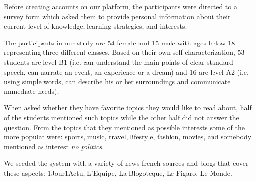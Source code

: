Before creating accounts on our platform, the participants were directed to a survey form which asked them to provide personal information about their current level of knowledge, learning strategies, and interests. 

The participants in our study are 54 female and 15 male with ages below 18 representing three different classes. Based on their own self characterization, 53 students are level B1 (i.e. can understand the main points of clear standard speech, can narrate an event, an experience or a dream) and 16 are level A2 (i.e. using simple words, can describe his or her surroundings and communicate immediate needs). 


When asked whether they have favorite topics they would like to read about, half of the students mentioned such topics while the other half did not answer the question. From the topics that they mentioned as possible interests some of the more popular were: sports, music, travel, lifestyle, fashion, movies, and somebody mentioned as interest {\em no politics}.

We seeded the system with a variety of news french sources and blogs that cover these aspects: 1Jour1Actu, L'Equipe, La Blogoteque, Le Figaro, Le Monde. 











